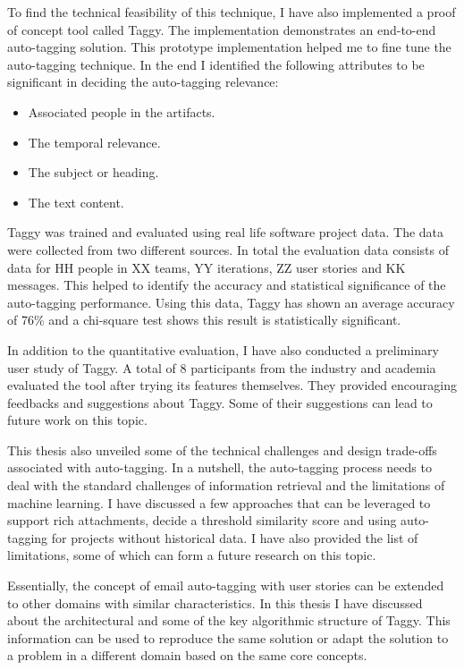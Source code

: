 To find the technical feasibility of this technique, I have also implemented a proof of concept tool called Taggy. The implementation demonstrates an end-to-end auto-tagging solution. This prototype implementation helped me to fine tune the auto-tagging technique. In the end I identified the following attributes to be significant in deciding the auto-tagging relevance:
\begin{itemize}
	\item Associated people in the artifacts.
	\item The temporal relevance.
	\item The subject or heading.
	\item The text content.	
\end{itemize}

Taggy was trained and evaluated using real life software project data. The data were collected from two different sources. In total the evaluation data consists of data for HH people in XX teams,  YY iterations, ZZ user stories and KK messages.  This helped to identify the accuracy and statistical significance of the auto-tagging performance. Using this data, Taggy has shown an average accuracy of 76\% and a chi-square test shows this result is statistically significant.

In addition to the quantitative evaluation, I have also conducted a preliminary user study of Taggy. A total of 8 participants from the industry and academia evaluated the tool after trying its features themselves. They provided encouraging feedbacks and suggestions about Taggy. Some of their suggestions can lead to future work on this topic.

This thesis also unveiled some of the technical challenges and design trade-offs associated with auto-tagging. In a nutshell, the auto-tagging process needs to deal with the standard challenges of information retrieval and the limitations of machine learning. I have discussed a few approaches that can be leveraged to support rich attachments, decide a threshold similarity score and using auto-tagging for projects without historical data. I have also provided the list of limitations, some of which can form a future research on this topic.

Essentially, the concept of email auto-tagging with user stories can be extended to other domains with similar characteristics. In this thesis I have discussed about the architectural and some of the key algorithmic structure of Taggy. This information can be used to reproduce the same solution or adapt the solution to a problem in a different domain based on the same core concepts.


